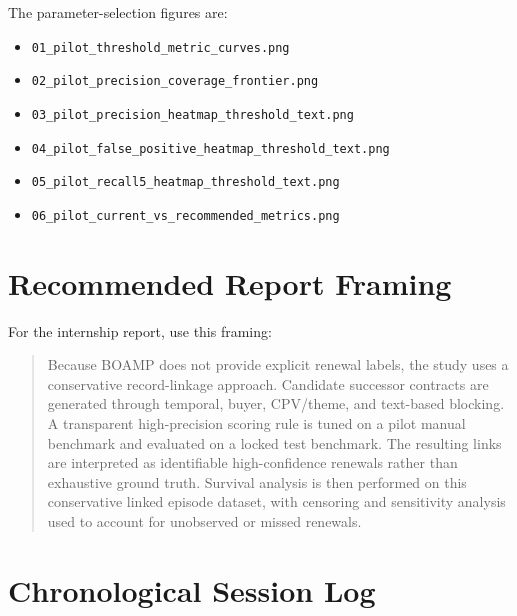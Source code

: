 \documentclass[11pt,a4paper]{article}
\newcommand{\pathcode}[1]{{\small\nolinkurl{#1}}}
\begin{document}
The parameter-selection figures are:

\begin{itemize}
  \item \pathcode{01_pilot_threshold_metric_curves.png}
  \item \pathcode{02_pilot_precision_coverage_frontier.png}
  \item \pathcode{03_pilot_precision_heatmap_threshold_text.png}
  \item \pathcode{04_pilot_false_positive_heatmap_threshold_text.png}
  \item \pathcode{05_pilot_recall5_heatmap_threshold_text.png}
  \item \pathcode{06_pilot_current_vs_recommended_metrics.png}
\end{itemize}

\section*{Recommended Report Framing}

For the internship report, use this framing:

\begin{quote}
Because BOAMP does not provide explicit renewal labels, the study uses a conservative record-linkage approach. Candidate successor contracts are generated through temporal, buyer, CPV/theme, and text-based blocking. A transparent high-precision scoring rule is tuned on a pilot manual benchmark and evaluated on a locked test benchmark. The resulting links are interpreted as identifiable high-confidence renewals rather than exhaustive ground truth. Survival analysis is then performed on this conservative linked episode dataset, with censoring and sensitivity analysis used to account for unobserved or missed renewals.
\end{quote}

\section*{Chronological Session Log}
\end{document}
